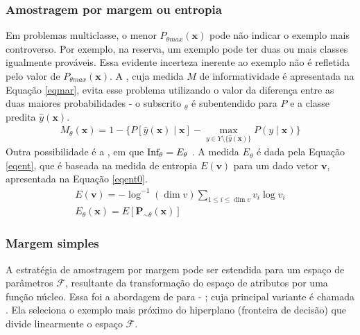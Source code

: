 \subsubsection{Amostragem por margem ou entropia}\label{mar}
Em problemas multiclasse, o menor $P_{\theta max}(\bm{x})$ pode não indicar o exemplo mais controverso.
Por exemplo, na reserva, um exemplo pode ter duas ou mais classes igualmente prováveis.
Essa evidente incerteza inerente ao exemplo não é refletida pelo valor de $P_{\theta max}(\bm{x})$.
A , cuja medida $M$ de informatividade é apresentada na Equação \ref{eqmar}, evita esse problema utilizando o valor da diferença entre as duas maiores probabilidades - o subscrito $_{\theta}$ é subentendido para $P$ e a classe predita $\hat{y}(\bm{x})$.
\begin{eqnarray} \label{eqz}
M_\theta(\bm{x})=1-\{P[\hat{y}(\bm{x})\mid\bm{x}]-\max_{y\in Y\setminus\{\hat{y}(\bm{x})\}}P(y\mid\bm{x})\}
\label{eqmar}
\end{eqnarray}
Outra possibilidade é a , em que $\operatorname*{Inf_\theta}=E_\theta$ \cite{journals/bioinformatics/LewinSA0P04}.
A medida $E_\theta$ é dada pela Equação \ref{eqent}, que é baseada na medida de entropia $E(\bm{v})$ para um dado vetor $\bm{v}$, apresentada na Equação \ref{eqent0}.
\begin{eqnarray} 
\label{eqent0}
E(\bm{v}) = -\log^{-1}(\dim v) \sum_{1 \leq i \leq \dim v} v_i \log v_i
\\
\label{eqent}
E_{\theta}(\bm{x}) = E[\bm{P}_{\sim\theta}(\bm{x})]
\end{eqnarray}

\subsubsection{Margem simples}\label{marsim}
A estratégia de amostragem por margem pode ser estendida para um espaço
de parâmetros $\mathcal{F}$, resultante da transformação do espaço de
atributos por uma função núcleo.
Essa foi a abordagem de  para  - \cite{hearst1998support};
cuja principal variante é chamada \textit{}.
Ela seleciona o exemplo mais próximo do hiperplano  
(fronteira de decisão) que divide linearmente o espaço $\mathcal{F}$.

